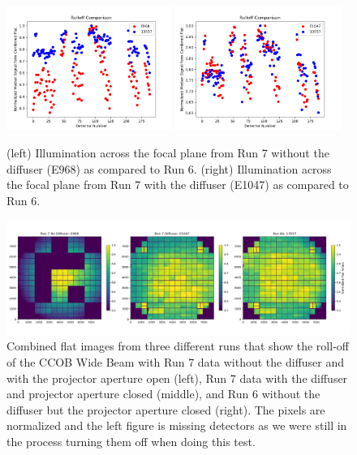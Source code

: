 \begin{figure}[htbp]
\centering
\includegraphics[width=0.48\textwidth]{figures/Run7_Illumination.png}
\includegraphics[width=0.48\textwidth]{figures/Run7_DiffuserIllumination.png}
\caption{(left) Illumination across the focal plane from Run 7 without the diffuser (E968) as compared to Run 6. (right) Illumination across the focal plane from Run 7 with the diffuser (E1047) as compared to Run 6.}
\label{fig:roll-off}
\end{figure}

\begin{figure}[ht]
    \centering
    \includegraphics[width=0.95\linewidth]{figures/Rolloff_FP.png}
    \caption{Combined flat images from three different runs that show the roll-off of the CCOB Wide Beam with Run 7 data without the diffuser and with the projector aperture open (left), Run 7 data with the diffuser and projector aperture closed (middle), and Run 6 without the diffuser but the projector aperture closed (right). The pixels are normalized and the left figure is missing detectors as we were still in the process turning them off when doing this test.}
    \label{fig:Rolloff_FP}
\end{figure}


